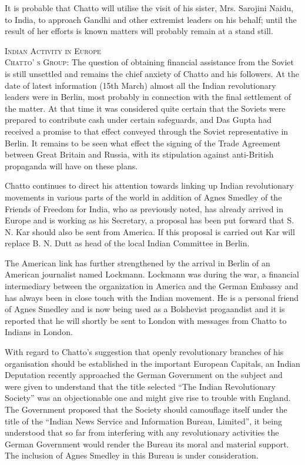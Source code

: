 It is probable that Chatto will utilise the visit of his sister, Mrs. Sarojini Naidu, to India, to approach Gandhi and other extremist leaders on his behalf; until the result of her efforts is known matters will probably remain at a stand still. 

\textsc{Indian Activity in Europe}\\

\textsc{Chatto’ s Group:} The question of obtaining financial assistance from the Soviet is still unsettled and remains the chief anxiety of Chatto and his followers. At the date of latest information (15th March) almost all the Indian revolutionary leaders were in Berlin, most probably in connection with the final settlement of the matter. At that time it was considered quite certain that the Soviets were prepared to contribute cash under certain safeguards, and Das Gupta had received a promise to that effect conveyed through the Soviet representative in Berlin. It remains to be seen what effect the signing of the Trade Agreement between Great Britain and Russia, with its stipulation against anti-British propaganda will have on these plans. 

Chatto continues to direct his attention towards linking up Indian revolutionary movements in various parts of the world in addition of Agnes Smedley of the Friends of Freedom for India, who as previously noted, has already arrived in Europe and is working as his Secretary, a proposal has been put forward that S. N. Kar should also be sent from America. If this proposal is carried out Kar will replace B. 
N. Dutt as head of the local Indian Committee in Berlin.

The American link has further strengthened by the arrival in Berlin of an American journalist named Lockmann. Lockmann was during the war, a financial intermediary between the organization in America and the German Embassy and has always been in close touch with the Indian movement.
He is a personal friend of Agnes Smedley and is now being used as a Bolshevist progaandist and it is reported that he will shortly be sent to London with messages from Chatto to Indians in London. 

With regard to Chatto’s suggestion that openly revolutionary branches of his organisation should be established in the important European Capitals, an Indian Deputation recently approached the German Government on the subject and were given to understand that the title selected “The Indian Revolutionary Society” was an objectionable one and might give rise to trouble with England. The Government proposed that the Society should camouflage itself under the title of the “Indian News Service and Information Bureau, Limited”, it being understood that so far from interfering with any revolutionary activities the German Government would render the Bureau its moral and material support. The inclusion of Agnes Smedley in this Bureau is under consideration. 

